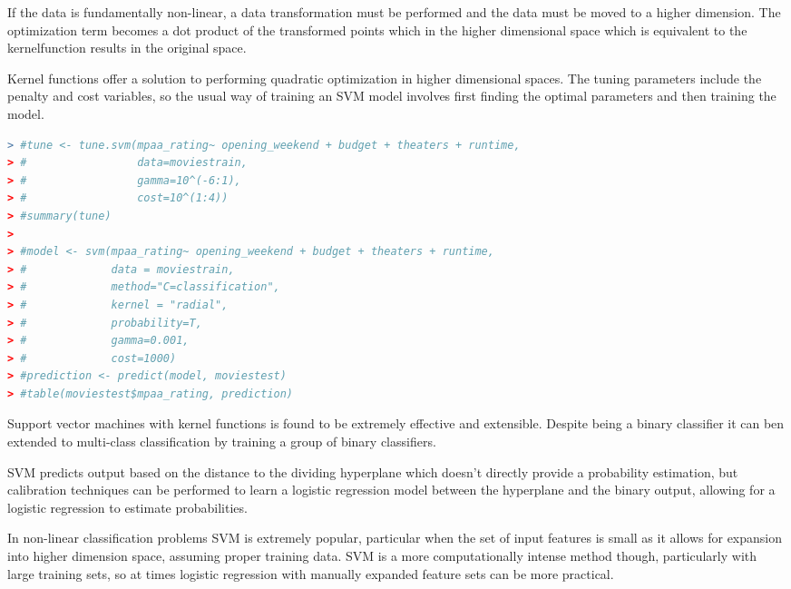 \documentclass{article}
\begin{document}
\begin{spacing}{1.1}
\vspace{3mm}

If the data is fundamentally non-linear, a data transformation must be performed and the data must be moved to a higher dimension.  The optimization term becomes a dot product of the transformed points which in the higher dimensional space which is equivalent to the kernelfunction results in the original space.  

\vspace{3mm}

Kernel functions offer a solution to performing quadratic optimization in higher dimensional spaces.  The tuning parameters include the penalty and cost variables, so the usual way of training an SVM model involves first finding the optimal parameters and then training the model.  

\begin{lstlisting}[language=R]
> #tune <- tune.svm(mpaa_rating~ opening_weekend + budget + theaters + runtime,
> #                 data=moviestrain,
> #                 gamma=10^(-6:1),
> #                 cost=10^(1:4))
> #summary(tune)
> 
> #model <- svm(mpaa_rating~ opening_weekend + budget + theaters + runtime,
> #             data = moviestrain,
> #             method="C=classification",
> #             kernel = "radial",
> #             probability=T,
> #             gamma=0.001,
> #             cost=1000)
> #prediction <- predict(model, moviestest)
> #table(moviestest$mpaa_rating, prediction)
\end{lstlisting}

Support vector machines with kernel functions is found to be extremely effective and extensible.  Despite being a binary classifier it can ben extended to multi-class classification by training a group of binary classifiers.  

\vspace{3mm}

SVM predicts output based on the distance to the dividing hyperplane which doesn't directly provide a probability estimation, but calibration techniques can be performed to learn a logistic regression model between the hyperplane and the binary output, allowing for a logistic regression to estimate probabilities.  

\vspace{3mm}

In non-linear classification problems SVM is extremely popular, particular when the set of input features is small as it allows for expansion into higher dimension space, assuming proper training data.  SVM is a more computationally intense method though, particularly with large training sets, so at times logistic regression with manually expanded feature sets can be more practical.  


\end{spacing}
\end{document}

